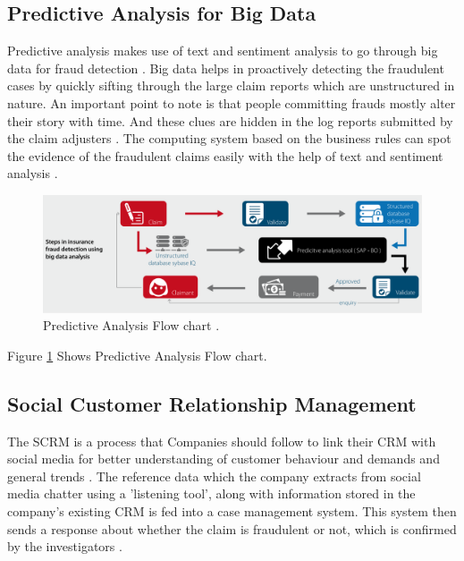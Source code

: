 \documentclass[sigconf]{acmart}
\begin{document}
\subsection{Predictive Analysis for Big Data}
Predictive analysis makes use of text and sentiment analysis to go through big data for fraud detection \cite{link9}. Big data helps in proactively detecting the fraudulent cases by quickly sifting through the large claim reports which are unstructured in nature. An important point to note is that people committing frauds mostly alter their story with time. And these clues are hidden in the log reports submitted by the claim adjusters \cite{link7}. The computing system based on the business rules can spot the evidence of the fraudulent claims easily with the help of text and sentiment analysis \cite{link9}.

\begin{figure}
  \includegraphics[width=\linewidth]{images/predictive_image1.png}
  \caption{Predictive Analysis Flow chart \cite{link7}.}
  \label{F: Predictive Analysis flowchart}
\end{figure}
Figure \ref{F: Predictive Analysis flowchart} Shows Predictive Analysis Flow chart.\\

\subsection{Social Customer Relationship Management}
The SCRM is a process that Companies should follow to link their CRM with social media for better understanding of customer behaviour and demands and general trends \cite{link9}. The reference data which the company extracts from social media chatter using a 'listening tool', along with information stored in the company's existing CRM is fed into a case management system. This system then sends a response about whether the claim is fraudulent or not, which is confirmed by the investigators \cite{link7}.
\end{document}
